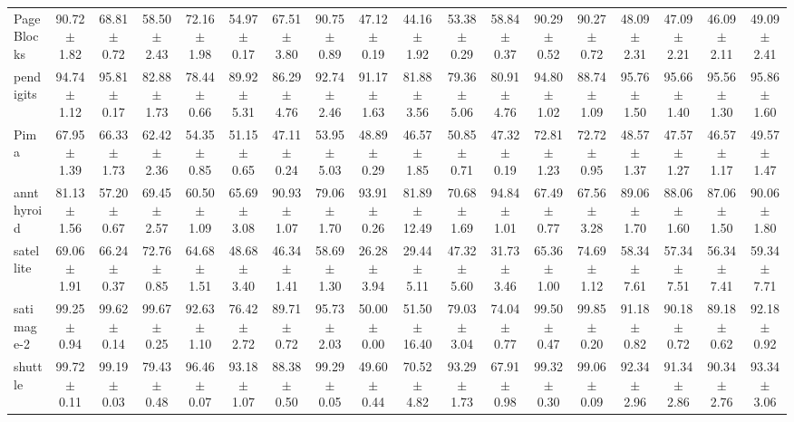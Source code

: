 \begin{table}[ht]
\begin{adjustbox}{max width=\textwidth}
\begin{tabular}{lccccccccccccccccc}
      PageBlocks &  90.72 $\pm$ 1.82 &  68.81 $\pm$ 0.72 &  58.50 $\pm$ 2.43 &  72.16 $\pm$ 1.98 &  54.97 $\pm$ 0.17 &  67.51 $\pm$ 3.80 &  90.75 $\pm$ 0.89 & 47.12 $\pm$ 0.19 &  44.16 $\pm$ 1.92 &  53.38 $\pm$ 0.29 &  58.84 $\pm$ 0.37 &  90.29 $\pm$ 0.52 &  90.27 $\pm$ 0.72 &  48.09 $\pm$ 2.31 &  47.09 $\pm$ 2.21 &  46.09 $\pm$ 2.11 &  49.09 $\pm$ 2.41 \\
       pendigits &  94.74 $\pm$ 1.12 &  95.81 $\pm$ 0.17 &  82.88 $\pm$ 1.73 &  78.44 $\pm$ 0.66 &  89.92 $\pm$ 5.31 &  86.29 $\pm$ 4.76 &  92.74 $\pm$ 2.46 & 91.17 $\pm$ 1.63 &  81.88 $\pm$ 3.56 &  79.36 $\pm$ 5.06 &  80.91 $\pm$ 4.76 &  94.80 $\pm$ 1.02 &  88.74 $\pm$ 1.09 &  95.76 $\pm$ 1.50 &  95.66 $\pm$ 1.40 &  95.56 $\pm$ 1.30 &  95.86 $\pm$ 1.60 \\
            Pima &  67.95 $\pm$ 1.39 &  66.33 $\pm$ 1.73 &  62.42 $\pm$ 2.36 &  54.35 $\pm$ 0.85 &  51.15 $\pm$ 0.65 &  47.11 $\pm$ 0.24 &  53.95 $\pm$ 5.03 & 48.89 $\pm$ 0.29 &  46.57 $\pm$ 1.85 &  50.85 $\pm$ 0.71 &  47.32 $\pm$ 0.19 &  72.81 $\pm$ 1.23 &  72.72 $\pm$ 0.95 &  48.57 $\pm$ 1.37 &  47.57 $\pm$ 1.27 &  46.57 $\pm$ 1.17 &  49.57 $\pm$ 1.47 \\
      annthyroid &  81.13 $\pm$ 1.56 &  57.20 $\pm$ 0.67 &  69.45 $\pm$ 2.57 &  60.50 $\pm$ 1.09 &  65.69 $\pm$ 3.08 &  90.93 $\pm$ 1.07 &  79.06 $\pm$ 1.70 & 93.91 $\pm$ 0.26 & 81.89 $\pm$ 12.49 &  70.68 $\pm$ 1.69 &  94.84 $\pm$ 1.01 &  67.49 $\pm$ 0.77 &  67.56 $\pm$ 3.28 &  89.06 $\pm$ 1.70 &  88.06 $\pm$ 1.60 &  87.06 $\pm$ 1.50 &  90.06 $\pm$ 1.80 \\
       satellite &  69.06 $\pm$ 1.91 &  66.24 $\pm$ 0.37 &  72.76 $\pm$ 0.85 &  64.68 $\pm$ 1.51 &  48.68 $\pm$ 3.40 &  46.34 $\pm$ 1.41 &  58.69 $\pm$ 1.30 & 26.28 $\pm$ 3.94 &  29.44 $\pm$ 5.11 &  47.32 $\pm$ 5.60 &  31.73 $\pm$ 3.46 &  65.36 $\pm$ 1.00 &  74.69 $\pm$ 1.12 &  58.34 $\pm$ 7.61 &  57.34 $\pm$ 7.51 &  56.34 $\pm$ 7.41 &  59.34 $\pm$ 7.71 \\
      satimage-2 &  99.25 $\pm$ 0.94 &  99.62 $\pm$ 0.14 &  99.67 $\pm$ 0.25 &  92.63 $\pm$ 1.10 &  76.42 $\pm$ 2.72 &  89.71 $\pm$ 0.72 &  95.73 $\pm$ 2.03 & 50.00 $\pm$ 0.00 & 51.50 $\pm$ 16.40 &  79.03 $\pm$ 3.04 &  74.04 $\pm$ 0.77 &  99.50 $\pm$ 0.47 &  99.85 $\pm$ 0.20 &  91.18 $\pm$ 0.82 &  90.18 $\pm$ 0.72 &  89.18 $\pm$ 0.62 &  92.18 $\pm$ 0.92 \\
         shuttle &  99.72 $\pm$ 0.11 &  99.19 $\pm$ 0.03 &  79.43 $\pm$ 0.48 &  96.46 $\pm$ 0.07 &  93.18 $\pm$ 1.07 &  88.38 $\pm$ 0.50 &  99.29 $\pm$ 0.05 & 49.60 $\pm$ 0.44 &  70.52 $\pm$ 4.82 &  93.29 $\pm$ 1.73 &  67.91 $\pm$ 0.98 &  99.32 $\pm$ 0.30 &  99.06 $\pm$ 0.09 &  92.34 $\pm$ 2.96 &  91.34 $\pm$ 2.86 &  90.34 $\pm$ 2.76 &  93.34 $\pm$ 3.06 \\

\end{tabular}
\end{adjustbox}
\end{table}
